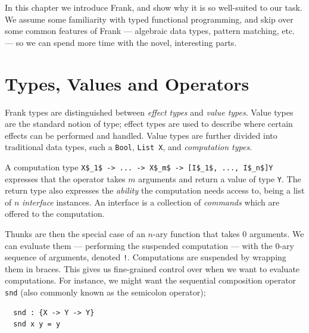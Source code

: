 \documentclass[msc,deptreport,cs]{infthesis} %
\newcommand{\code}[1]{\lstinline{#1}}
\begin{document}
In this chapter we introduce Frank, and show why it is so well-suited to our
task. We assume some familiarity with typed functional programming, and skip
over some common features of Frank --- algebraic data types, pattern matching,
etc. --- so we can spend more time with the novel, interesting parts.

\section{Types, Values and Operators}

Frank types are distinguished between \emph{effect types} and \emph{value
  types}. Value types are the standard notion of type; effect types are
used to describe where certain effects can be performed and handled. Value types are further divided into traditional data types, such a \code{Bool},
\code{List X}, and \emph{computation types}.

A computation type
%
\lstinline[mathescape]!X$_1$ -> ... -> X$_m$ -> [I$_1$, ..., I$_n$]Y!
%
expresses that the operator takes $m$ arguments and return a value of type
\code{Y}. The return type also expresses the \emph{ability} the computation
needs access to, being a list of $n$ \emph{interface} instances. An interface is
a collection of \emph{commands} which are offered to the computation.


Thunks are then the special case of an $n$-ary function that takes 0 arguments.
We can evaluate them --- performing the suspended computation --- with the 0-ary
sequence of arguments, denoted \code{!}. Computations are suspended by wrapping
them in braces. This gives us fine-grained control over when we want to evaluate
computations. For instance, we might want the sequential composition operator
\code{snd} (also commonly known as the semicolon operator);

\begin{lstlisting}
  snd : {X -> Y -> Y}
  snd x y = y
\end{lstlisting}
\end{document}
